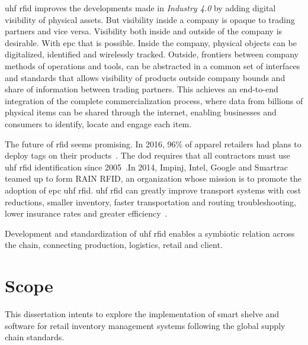\ac{uhf} \ac{rfid} improves the developments made in \emph{Industry 4.0} by adding digital visibility of physical assets. But visibility inside a company is opaque to trading partners and vice versa. Visibility both inside and outside of the company is desirable. With \ac{epc} that is possible. Inside the company, physical objects can be digitalized, identified and wirelessly tracked. Outside, frontiers between company methods of operations and tools, can be abstracted in a common set of interfaces and standards that allows visibility of products outside company bounds and share of information between trading partners.
This achieves an end-to-end integration of the complete commercialization process, where data from billions of physical items can be shared through the internet, enabling businesses and consumers to identify, locate and engage each item.

The future of \ac{rfid} seems promising. In 2016, 96\% of apparel retailers had plans to deploy tags on their products~\cite{hardgrave2016StateRFID}. The \ac{dod} requires that all contractors must use \ac{uhf} \ac{rfid} identification since 2005~\cite{DODReleasesFinal}.In 2014, Impinj, Intel, Google and Smartrac teamed up to form RAIN RFID, an organization whose mission is to promote the adoption of \acs{epc} \ac{uhf} \ac{rfid}. \ac{uhf} \ac{rfid} can greatly improve transport systems with cost reductions, smaller inventory, faster transportation and routing troubleshooting, lower insurance rates and greater efficiency~\cite{oanaRFIDTechnologyContainers2013}.

Development and standardization of \ac{uhf} \ac{rfid} enables a symbiotic relation across the chain, connecting production, logistics, retail and client.

\section{Scope}

This dissertation intents to explore the implementation of smart shelve and software for retail inventory management systems following the global supply chain standards. 




